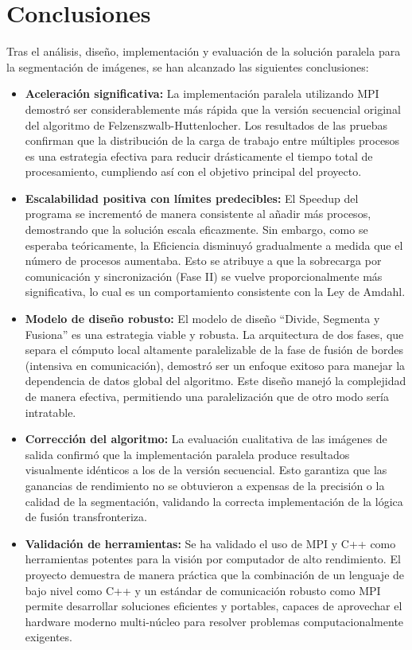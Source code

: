 \documentclass[fleqn,10pt]{article}
\begin{document}
\clearpage
\section{Conclusiones}
Tras el análisis, diseño, implementación y evaluación de la solución paralela para la segmentación de imágenes, se han alcanzado las siguientes conclusiones:

\begin{itemize}
    \item \textbf{Aceleración significativa:} La implementación paralela utilizando MPI demostró ser considerablemente más rápida que la versión secuencial original del algoritmo de Felzenszwalb-Huttenlocher. Los resultados de las pruebas confirman que la distribución de la carga de trabajo entre múltiples procesos es una estrategia efectiva para reducir drásticamente el tiempo total de procesamiento, cumpliendo así con el objetivo principal del proyecto.
    \item \textbf{Escalabilidad positiva con límites predecibles:} El Speedup del programa se incrementó de manera consistente al añadir más procesos, demostrando que la solución escala eficazmente. Sin embargo, como se esperaba teóricamente, la Eficiencia disminuyó gradualmente a medida que el número de procesos aumentaba. Esto se atribuye a que la sobrecarga por comunicación y sincronización (Fase II) se vuelve proporcionalmente más significativa, lo cual es un comportamiento consistente con la Ley de Amdahl.
    \item \textbf{Modelo de diseño robusto:} El modelo de diseño ``Divide, Segmenta y Fusiona'' es una estrategia viable y robusta. La arquitectura de dos fases, que separa el cómputo local altamente paralelizable de la fase de fusión de bordes (intensiva en comunicación), demostró ser un enfoque exitoso para manejar la dependencia de datos global del algoritmo. Este diseño manejó la complejidad de manera efectiva, permitiendo una paralelización que de otro modo sería intratable.
    \item \textbf{Corrección del algoritmo:} La evaluación cualitativa de las imágenes de salida confirmó que la implementación paralela produce resultados visualmente idénticos a los de la versión secuencial. Esto garantiza que las ganancias de rendimiento no se obtuvieron a expensas de la precisión o la calidad de la segmentación, validando la correcta implementación de la lógica de fusión transfronteriza.
    \item \textbf{Validación de herramientas:} Se ha validado el uso de MPI y C++ como herramientas potentes para la visión por computador de alto rendimiento. El proyecto demuestra de manera práctica que la combinación de un lenguaje de bajo nivel como C++ y un estándar de comunicación robusto como MPI permite desarrollar soluciones eficientes y portables, capaces de aprovechar el hardware moderno multi-núcleo para resolver problemas computacionalmente exigentes.
\end{itemize}
\end{document}
